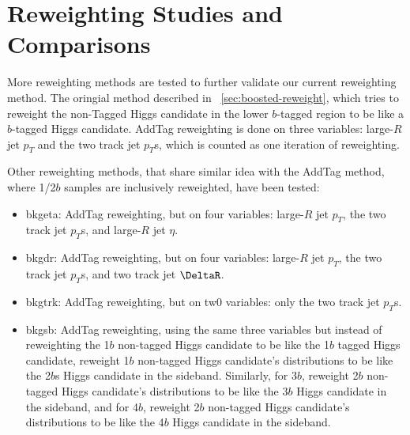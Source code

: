 \section{Reweighting Studies and Comparisons}
\label{app:reweightstudy}

More reweighting methods are tested to further validate our current reweighting method. The oringial method described in ~\ref{sec:boosted-reweight}, which tries to reweight the non-Tagged Higgs candidate in the lower $b$-tagged region to be like a $b$-tagged Higgs candidate. AddTag reweighting is done on three variables: large-$R$ jet $p_{T}$ and the two track jet $p_{T}$s, which is counted as one iteration of reweighting.

Other reweighting methods, that share similar idea with the AddTag method, where 1/2$b$ samples are inclusively reweighted, have been tested:
\begin{itemize}
	\item bkgeta: AddTag reweighting, but on four variables: large-$R$ jet $p_{T}$, the two track jet $p_{T}$s, and large-$R$ jet $\eta$.
	\item bkgdr: AddTag reweighting, but on four variables: large-$R$ jet $p_{T}$, the two track jet $p_{T}$s, and two track jet $\DeltaR$.
	\item bkgtrk: AddTag reweighting, but on tw0 variables: only the two track jet $p_{T}$s.
	\item bkgsb: AddTag reweighting, using the same three variables but instead of reweighting the 1$b$ non-tagged Higgs candidate to be like the 1$b$ tagged Higgs candidate, reweight 1$b$ non-tagged Higgs candidate's distributions to be like the 2$b$s Higgs candidate in the sideband. Similarly, for 3$b$, reweight 2$b$ non-tagged Higgs candidate's distributions to be like the 3$b$ Higgs candidate in the sideband, and for 4$b$, reweight 2$b$ non-tagged Higgs candidate's distributions to be like the 4$b$ Higgs candidate in the sideband.
\end{itemize}

